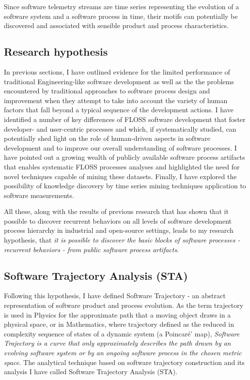 Since software telemetry streams are time series representing the evolution of a software system 
and a software process in time, their motifs can potentially be discovered and associated with sensible product 
and process characteristics.

%
%
\subsection{Research hypothesis}\label{section_research_hypothesis}
In previous sections, I have outlined evidence for the limited performance of traditional Engineering-like 
software development as well as the the problems encountered by traditional approaches to software process 
design and improvement when they attempt to take into account the variety of human factors that fall beyond 
a typical sequence of the development actions.
I have identified a number of key differences of FLOSS software development that foster developer- and user-centric 
processes and which, if systematically studied, can potentially shed light on the role of human-driven aspects in 
software development and to improve our overall understanding of software processes. 
I have pointed out a growing wealth of publicly available software process artifacts that enables systematic FLOSS 
processes analyses and highlighted the need for novel techniques capable of mining these datasets.
Finally, I have explored the possibility of knowledge discovery by time series mining techniques application 
to software measurements.

All these, along with the results of previous research that has shown that it possible to discover 
recurrent behaviors on all levels of software development process hierarchy \cite{citeulike:8347315} 
in industrial \cite{citeulike:5090131} and open-source \cite{citeulike:10377345} settings, 
leads to my research hypothesis, that \textit{it is possible to discover the basic blocks of software 
processes - recurrent behaviors - from public software process artifacts}. 

\subsection{Software Trajectory Analysis (STA)}
Following this hypothesis, I have defined Software Trajectory - an abstract representation of software
product and process evolution. As the term trajectory is used in Physics for the approximate path that a 
moving object draws in a physical space, or in Mathematics, where trajectory defined as the reduced in 
complexity sequence of states of a dynamic system (a Poincar\'{e}' map), \textit{Software Trajectory is a curve
that only approximately describes the path drawn by an evolving software system or by an ongoing software 
process in the chosen metric space}. The analytical technique based on software trajectory construction
and its analysis I have called Software Trajectory Analysis (STA).

